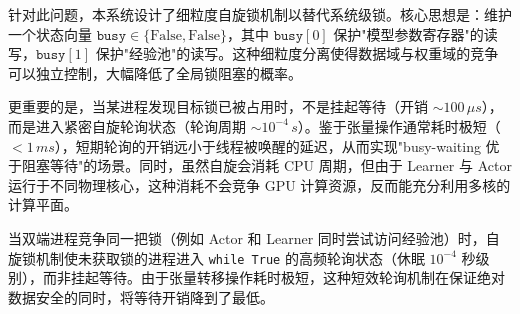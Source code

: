 \documentclass[
  oneside,
  degree=bachelor,
  fullwidthstop=false,
  fontset=fandol,
  times=false,
  minted=true,
  biblatex=true,
]{tongjithesis}
\begin{document}
针对此问题，本系统设计了细粒度自旋锁机制以替代系统级锁。核心思想是：维护一个状态向量 $\texttt{busy} \in \{\text{False}, \text{False}\}$，其中 $\texttt{busy}[0]$ 保护"模型参数寄存器"的读写，$\texttt{busy}[1]$ 保护"经验池"的读写。这种细粒度分离使得数据域与权重域的竞争可以独立控制，大幅降低了全局锁阻塞的概率。

更重要的是，当某进程发现目标锁已被占用时，不是挂起等待（开销 $\sim 100\,\mu s$），而是进入紧密自旋轮询状态（轮询周期 $\sim 10^{-4}\,s$）。鉴于张量操作通常耗时极短（$< 1\,ms$），短期轮询的开销远小于线程被唤醒的延迟，从而实现"busy-waiting 优于阻塞等待"的场景。同时，虽然自旋会消耗 CPU 周期，但由于 Learner 与 Actor 运行于不同物理核心，这种消耗不会竞争 GPU 计算资源，反而能充分利用多核的计算平面。

当双端进程竞争同一把锁（例如 Actor 和 Learner 同时尝试访问经验池）时，自旋锁机制使未获取锁的进程进入 \texttt{while True} 的高频轮询状态（休眠 $10^{-4}$ 秒级别），而非挂起等待。由于张量转移操作耗时极短，这种短效轮询机制在保证绝对数据安全的同时，将等待开销降到了最低。
\end{document}
